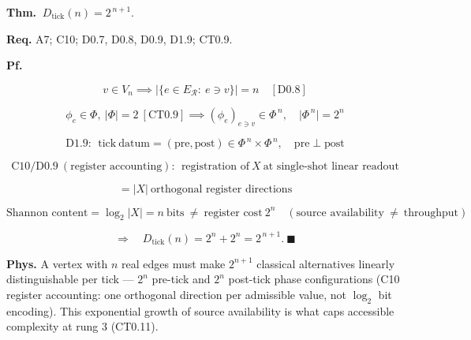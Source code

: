 \begin{theorem}\label{tag:CT0-5}
\textbf{Thm.} $\ D_{\mathrm{tick}}(n)=2^{\,n+1}.$

\textbf{Req.} A7; C10; D0.7, D0.8, D0.9, D1.9; CT0.9.

\textbf{Pf.}

\[
v\in V_n\implies\bigl|\{e\in E_{\mathcal R}:\ e\ni v\}\bigr|=n\quad[\mathrm{D0.8}]
\]

\[
\phi_e\in\Phi,\ |\Phi|=2\ [\mathrm{CT0.9}]\implies(\phi_e)_{e\ni v}\in\Phi^{\,n},\quad\bigl|\Phi^{\,n}\bigr|=2^n
\]

\[
\mathrm{D1.9}:\ \ \mathrm{tick\ datum}=(\mathrm{pre},\mathrm{post})\in\Phi^{\,n}\times\Phi^{\,n},\quad \mathrm{pre}\perp\mathrm{post}
\]

\[
\mathrm{C10}/\mathrm{D0.9}\ (\text{register accounting}):\ \ \text{registration of}\ X\ \text{at single-shot linear readout}
\]

\[
= |X|\ \text{orthogonal register directions}
\]

\[
\text{Shannon content}=\log_2|X|=n\ \text{bits}\ \ne\ \text{register cost}\ 2^n\quad(\text{source availability}\ \ne\ \text{throughput})
\]

\[
\Longrightarrow\quad D_{\mathrm{tick}}(n)=2^n+2^n=2^{\,n+1}.\ \blacksquare
\]

\textbf{Phys.} A vertex with $n$ real edges must make $2^{n+1}$ classical alternatives linearly distinguishable per tick — $2^n$ pre-tick and $2^n$ post-tick phase configurations (C10 register accounting: one orthogonal direction per admissible value, not $\log_2$ bit encoding). This exponential growth of source availability is what caps accessible complexity at rung 3 (CT0.11).

\end{theorem}

